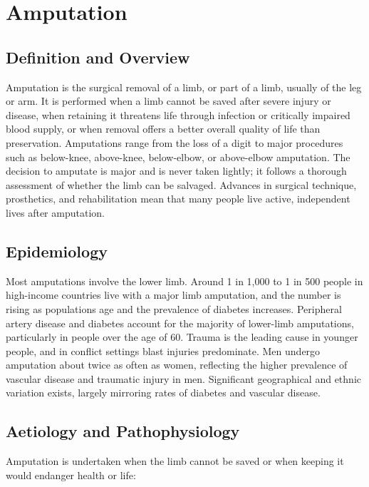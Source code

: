\chapter{Amputation}

\section*{Definition and Overview}
Amputation is the surgical removal of a limb, or part of a limb, usually of the leg or arm. It is performed when a limb cannot be saved after severe injury or disease, when retaining it threatens life through infection or critically impaired blood supply, or when removal offers a better overall quality of life than preservation. Amputations range from the loss of a digit to major procedures such as below-knee, above-knee, below-elbow, or above-elbow amputation. The decision to amputate is major and is never taken lightly; it follows a thorough assessment of whether the limb can be salvaged. Advances in surgical technique, prosthetics, and rehabilitation mean that many people live active, independent lives after amputation.

\section*{Epidemiology}
Most amputations involve the lower limb. Around 1 in 1,000 to 1 in 500 people in high-income countries live with a major limb amputation, and the number is rising as populations age and the prevalence of diabetes increases. Peripheral artery disease and diabetes account for the majority of lower-limb amputations, particularly in people over the age of 60. Trauma is the leading cause in younger people, and in conflict settings blast injuries predominate. Men undergo amputation about twice as often as women, reflecting the higher prevalence of vascular disease and traumatic injury in men. Significant geographical and ethnic variation exists, largely mirroring rates of diabetes and vascular disease.

\section*{Aetiology and Pathophysiology}
Amputation is undertaken when the limb cannot be saved or when keeping it would endanger health or life:

